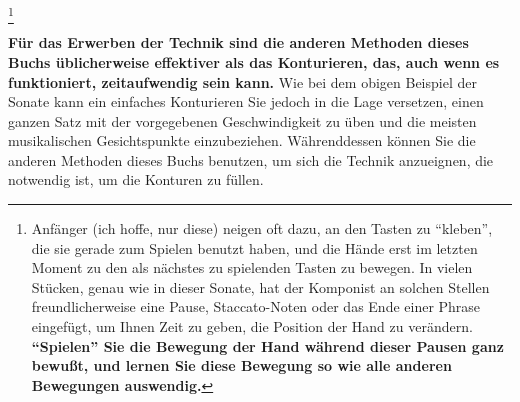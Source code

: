 \hypertarget{pausen}{}\footnote{Anfänger (ich hoffe, nur diese) neigen oft dazu, an den Tasten zu \enquote{kleben}, die sie gerade zum Spielen benutzt haben, und die Hände erst im letzten Moment zu den als nächstes zu spielenden Tasten zu bewegen.
In vielen Stücken, genau wie in dieser Sonate, hat der Komponist an solchen Stellen freundlicherweise eine Pause, Staccato-Noten oder das Ende einer 
Phrase eingefügt, um Ihnen Zeit zu geben, die Position der Hand zu verändern.
\textbf{\enquote{Spielen} Sie die Bewegung der Hand während dieser Pausen ganz bewußt, und lernen Sie diese Bewegung so wie alle anderen Bewegungen auswendig.}}

\textbf{Für das Erwerben der Technik sind die anderen Methoden dieses Buchs üblicherweise effektiver als das Konturieren, das, auch wenn es funktioniert, zeitaufwendig sein kann.}
Wie bei dem obigen Beispiel der Sonate kann ein einfaches Konturieren Sie jedoch in die Lage versetzen, einen ganzen Satz mit der vorgegebenen Geschwindigkeit zu üben und die meisten musikalischen Gesichtspunkte einzubeziehen.
Währenddessen können Sie die anderen Methoden dieses Buchs benutzen, um sich die Technik anzueignen, die notwendig ist, um die Konturen zu füllen.




